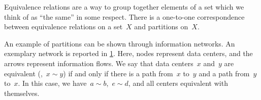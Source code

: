 \begin{remark}
  Equivalence relations are a way to group together elements of a set which we think of as ``the same'' in some respect. There is a one-to-one correspondence between equivalence relations on a set~$X$ and partitions on~$X$.
\end{remark}

\begin{example}
  An example of partitions can be shown through information networks. An exemplary network is reported in \cref{fig:info_network}. Here, nodes represent data centers, and the arrows represent information flows. We say that data centers~$x$ and~$y$ are equivalent (\ie ,~$x\sim y$) if and only if there is a path from~$x$ to~$y$ and a path from~$y$ to~$x$. In this case, we have~$a\sim b$,~$e\sim d$, and all centers equivalent with themselves.
\end{example}

\begin{figure}[h!]
  \begin{center}
  \end{center}
  \caption{\label{fig:info_network}}
\end{figure}

